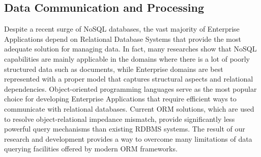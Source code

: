 \begin{figure}[!h]
  \end{figure}


  \subsection{Data Communication and Processing}
  
  Despite a recent surge of NoSQL databases, the vast majority of Enterprise Applications depend on Relational Database Systems that provide the most adequate solution for managing data.
  In fact, many researches show that NoSQL capabilities are mainly applicable in the domains where there is a lot of poorly structured data such as documents, while Enterprise domains are best represented with a proper model that captures structural aspects and relational dependencies.
  Object-oriented programming languages serve as the most popular choice for developing Enterprise Applications that require efficient ways to communicate with relational databases.  
  Current ORM solutions, which are used to resolve object-relational impedance mismatch, provide significantly less powerful query mechanisms than existing RDBMS systems.
  The result of our research and development provides a way to overcome many limitations of data querying facilities offered by modern ORM frameworks.
  
